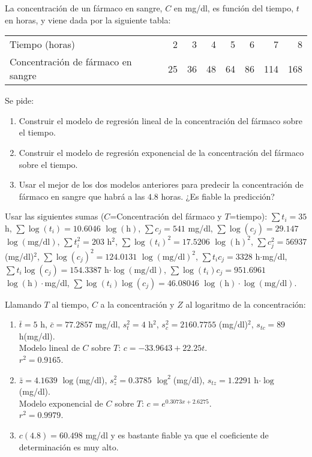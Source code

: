 {La concentración de un fármaco en sangre, $C$ en mg/dl, es función del tiempo, $t$ en horas, y viene dada por la siguiente tabla: 
\begin{center}
\begin{tabular}{lrrrrrrr}
\toprule
Tiempo (horas) & 2 & 3 & 4 & 5 & 6 & 7 & 8\\
Concentración de fármaco en sangre & 25 & 36 & 48 & 64 & 86 & 114 & 168\\
\bottomrule
\end{tabular}
\end{center}
Se pide:
\begin{enumerate}
\item Construir el modelo de regresión lineal de la concentración del fármaco sobre el tiempo.
\item Construir el modelo de regresión exponencial de la concentración del fármaco sobre el tiempo.
\item Usar el mejor de los dos modelos anteriores para predecir la concentración de fármaco en sangre que habrá a las $4.8$ horas.
¿Es fiable la predicción?
\end{enumerate}

Usar las siguientes sumas ($C$=Concentración del fármaco y $T$=tiempo): $\sum t_i=35$ h, $\sum \log(t_i)=10.6046$
$\log(\mbox{h})$, $\sum c_j=541$ mg/dl, $\sum \log(c_j)= 29.147$ $\log(\mbox{mg/dl})$, $\sum t_i^2=203$ h$^2$,
$\sum \log(t_i)^2=17.5206$ $\log(\mbox{h})^2$, $\sum c_j^2=56937$ (mg/dl)$^2$, $\sum \log(c_j)^2=124.0131$
$\log(\mbox{mg/dl})^2$, $\sum t_ic_j=3328$ h$\cdot$mg/dl, $\sum t_i\log(c_j)=154.3387$
h$\cdot\log(\mbox{mg/dl})$, $\sum \log(t_i)c_j=951.6961$ $\log(\mbox{h})\cdot$mg/dl, $\sum
\log(t_i)\log(c_j)=46.08046$ $\log(\mbox{h})\cdot\log(\mbox{mg/dl})$.
}
{Llamando $T$ al tiempo, $C$ a la concentración y $Z$ al logaritmo de la concentración:
\begin{enumerate}
\item $\bar t=5$ h, $\bar c=77.2857$ mg/dl, $s_t^2=4$ h$^2$,  $s_c^2=2160.7755$ (mg/dl)$^2$, $s_{tc}=89$ h(mg/dl).\\
Modelo lineal de $C$ sobre $T$: $c=−33.9643+22.25t$.\\
$r^2=0.9165$.
\item  $\bar z=4.1639$ $\log$(mg/dl), $s_z^2=0.3785$ $\log^2$(mg/dl),
$s_{tz}=1.2291$ h$\cdot\log$(mg/dl).\\
Modelo exponencial de $C$ sobre $T$: $c=e^{0.3073x+2.6275}$.\\
$r^2=0.9979$.
\item $c(4.8)= 60.498$ mg/dl y es bastante fiable ya que el coeficiente de determinación es muy alto.
\end{enumerate}
}
